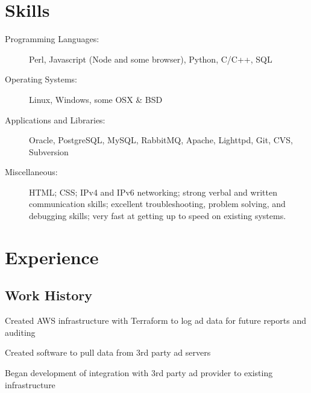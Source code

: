 \documentclass[table,tmargin=1in,bmargin=1in,letterpaper]{resume}
\author{Ryan Voots}
\begin{document}
\maketitle
\vspace{0.1in}

\section{Skills}
\begin{description}
\item[Programming Languages:]
Perl, Javascript (Node and some browser), Python, C/C++, SQL
\item[Operating Systems:]
Linux, Windows, some OSX \& BSD
\item[Applications and Libraries:]
Oracle, PostgreSQL, MySQL, RabbitMQ, Apache, Lighttpd, Git, CVS, Subversion
\item[Miscellaneous:]
HTML; CSS; IPv4 and IPv6 networking; strong verbal and written communication skills; excellent troubleshooting, problem solving, and debugging skills; very fast at getting up to speed on existing systems.
\end{description}

\section{Experience}

\subsection{Work History}

\begin{compactitem}
\item Created AWS infrastructure with Terraform to log ad data for future reports and auditing
\item Created software to pull data from 3rd party ad servers
\item Began development of integration with 3rd party ad provider to existing infrastructure
\end{compactitem}
\end{document}
